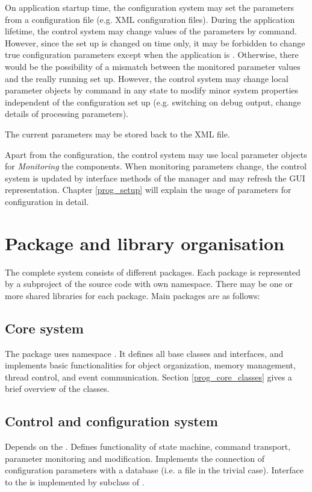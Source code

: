 On application startup time, the configuration system may 
set the parameters from a configuration file (e.g. XML configuration files). 
During the application lifetime, the control system may change 
values of the parameters by command. However, since the set 
up is changed on  time only, it may be forbidden to change 
true configuration parameters except when the application is . 
Otherwise, there would be the possibility of a mismatch between the 
monitored parameter values and the really running set up.
However, the control system may change local parameter objects 
by command in any state to modify minor system properties 
independent of the configuration set up (e.g. switching on 
debug output, change details of processing parameters).
      
The current parameters  may be stored back to the XML file.

      
Apart from the configuration, 
the control system may use local parameter objects for 
{\sl Monitoring} the components. When monitoring parameters change, 
the control system is updated by interface methods of the 
manager and may refresh the GUI representation.
Chapter \ref{prog_setup} will explain the usage of parameters for configuration
in detail. 


\section{Package and library organisation}
The complete system consists of different packages. 
Each package is represented by a subproject of the source code with own namespace. 
There may be one or more shared libraries for each package. Main packages are as follows: 




\subsection{Core system}
The  package uses namespace .
It defines all base classes and interfaces, 
and implements basic functionalities for object organization, memory management, 
thread control, and event communication. Section \ref{prog_core_classes} gives a brief overview of the
  classes.
   

\subsection{Control and configuration system}
   Depends on the . Defines 
   functionality of state machine, command transport, parameter 
   monitoring and modification. Implements the 
   connection of configuration parameters with a database 
   (i.e. a file in the trivial case). Interface to the  is 
   implemented by subclass of .
   
